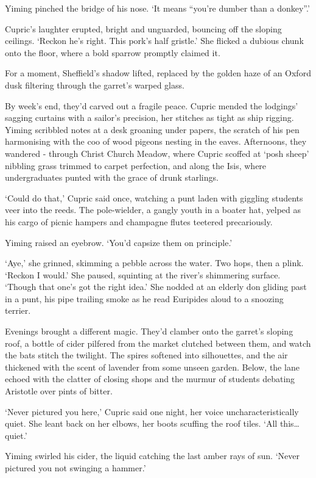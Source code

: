 Yiming pinched the bridge of his nose. `It means ``you're dumber than a donkey''.'

Cupric's laughter erupted, bright and unguarded, bouncing off the sloping ceilings. `Reckon he's right. This pork's half gristle.' She flicked a dubious chunk onto the floor, where a bold sparrow promptly claimed it.

For a moment, Sheffield's shadow lifted, replaced by the golden haze of an Oxford dusk filtering through the garret's warped glass.

By week's end, they'd carved out a fragile peace. Cupric mended the lodgings' sagging curtains with a sailor's precision, her stitches as tight as ship rigging. Yiming scribbled notes at a desk groaning under papers, the scratch of his pen harmonising with the coo of wood pigeons nesting in the eaves. Afternoons, they wandered - through Christ Church Meadow, where Cupric scoffed at `posh sheep' nibbling grass trimmed to carpet perfection, and along the Isis, where undergraduates punted with the grace of drunk starlings.

`Could do that,' Cupric said once, watching a punt laden with giggling students veer into the reeds. The pole-wielder, a gangly youth in a boater hat, yelped as his cargo of picnic hampers and champagne flutes teetered precariously.

Yiming raised an eyebrow. `You'd capsize them on principle.'

`Aye,' she grinned, skimming a pebble across the water. Two hops, then a plink. `Reckon I would.' She paused, squinting at the river's shimmering surface. `Though that one's got the right idea.' She nodded at an elderly don gliding past in a punt, his pipe trailing smoke as he read Euripides aloud to a snoozing terrier.

Evenings brought a different magic. They'd clamber onto the garret's sloping roof, a bottle of cider pilfered from the market clutched between them, and watch the bats stitch the twilight. The spires softened into silhouettes, and the air thickened with the scent of lavender from some unseen garden. Below, the lane echoed with the clatter of closing shops and the murmur of students debating Aristotle over pints of bitter.

`Never pictured you here,' Cupric said one night, her voice uncharacteristically quiet. She leant back on her elbows, her boots scuffing the roof tiles. `All this\dots quiet.'

Yiming swirled his cider, the liquid catching the last amber rays of sun. `Never pictured you not swinging a hammer.'

